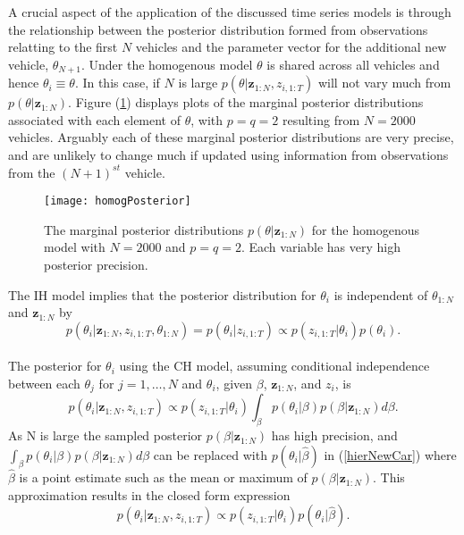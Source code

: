 \documentclass[12pt,a4paper]{article}\usepackage[]{graphicx}\usepackage[]{color}
\begin{document}
A crucial aspect of the application of the discussed time series models is through the relationship between the posterior distribution formed from observations relatting to the first $N$ vehicles and the parameter vector for the additional new vehicle, $\theta_{N+1}$. Under the homogenous model $\theta$ is shared across all vehicles and hence $\theta_{i} \equiv \theta$. In this case, if $N$ is large $p(\theta | \textbf{z}_{1:N}, z_{i, 1:T})$ will not vary much from $p(\theta | \textbf{z}_{1:N})$. Figure (\ref{fig:homogPosterior}) displays plots of the marginal posterior distributions associated with each element of $\theta$, with $p = q = 2$ resulting from $N = 2000$ vehicles. Arguably each of these marginal posterior distributions are very precise, and are unlikely to change much if updated using information from observations from the $(N+1)^{st}$ vehicle.

\begin{figure}
\centering
\texttt{[image: homogPosterior]}
\caption{The marginal posterior distributions $p(\theta | \textbf{z}_{1:N})$ for the homogenous model with $N = 2000$ and $p = q = 2$. Each variable has very high posterior precision.}
\label{fig:homogPosterior}
\end{figure}

The IH model implies that the posterior distribution for $\theta_i$ is independent of $\theta_{1:N}$ and $\textbf{z}_{1:N}$ by
\begin{equation}
p(\theta_{i}| \textbf{z}_{1:N}, z_{i,1:T}, \theta_{1:N}) = p(\theta_{i} | z_{i, 1:T}) \propto p(z_{i, 1:T} | \theta_i) p(\theta_i).
\label{indepNewCar}
\end{equation}
\\

The posterior for $\theta_i$ using the CH model, assuming conditional independence between each $\theta_j$ for $j = 1, \dots, N$ and $\theta_i$, given $\beta$, $\textbf{z}_{1:N}$, and $z_i$, is
\begin{equation}
\label{hierNewCar}
p(\theta_{i} | \textbf{z}_{1:N}, z_{i, 1:T}) \propto p(z_{i, 1:T} | \theta_{i}) \int_{\beta} p(\theta_{i} | \beta) p (\beta | \textbf{z}_{1:N}) d\beta.
\end{equation}
As N is large the sampled posterior $p(\beta | \textbf{z}_{1:N})$ has high precision, and $\int_{\beta} p(\theta_{i} | \beta) p (\beta | \textbf{z}_{1:N}) d\beta$ can be replaced with $p(\theta_{i} | \hat{\beta})$ in (\ref{hierNewCar}) where $\hat{\beta}$ is a point estimate such as the mean or maximum of $p(\beta | \textbf{z}_{1:N})$. This approximation results in the closed form expression
\begin{equation}
\label{hierNewCar2}
p(\theta_{i} | \textbf{z}_{1:N}, z_{i, 1:T}) \propto p(z_{i, 1:T} | \theta_{i}) p(\theta_{i} | \hat{\beta}).
\end{equation}
\\
\end{document}
